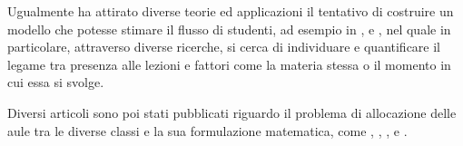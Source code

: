 Ugualmente ha attirato diverse teorie ed applicazioni il tentativo di costruire
un modello che potesse stimare il flusso di studenti, ad esempio in ,
 e , nel quale in particolare, attraverso 
diverse ricerche, si cerca di individuare e quantificare il legame tra presenza alle 
lezioni e fattori come la materia stessa o il momento in cui essa si svolge.

Diversi articoli sono poi stati pubblicati riguardo il problema di allocazione delle aule
tra le diverse classi e la sua formulazione matematica, come , 
, ,  e
.
